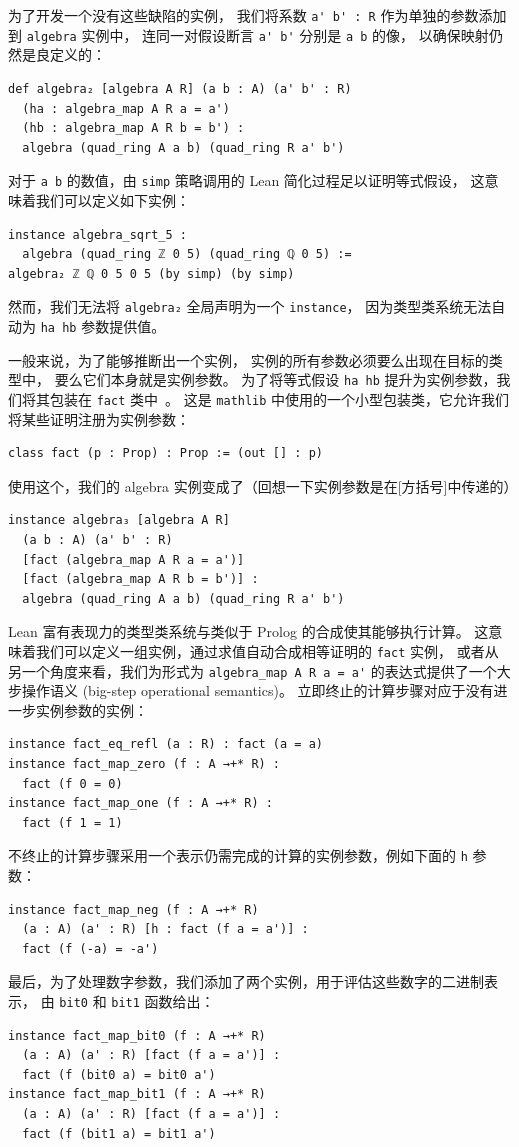 \documentclass[sigplan,10pt,nonacm,
screen]{acmart} \settopmatter{printfolios=true,printccs=false,printacmref=false}
\newcommand{\mathlib}{\lstinline{mathlib}\xspace}
\begin{document}
    为了开发一个没有这些缺陷的实例，
    我们将系数 \lstinline{a' b' : R} 作为单独的参数添加到 \lstinline{algebra} 实例中，
    连同一对假设断言 \lstinline{a' b'} 分别是 \lstinline{a b} 的像，
    以确保映射仍然是良定义的：
\begin{lstlisting}
def algebra₂ [algebra A R] (a b : A) (a' b' : R)
  (ha : algebra_map A R a = a')
  (hb : algebra_map A R b = b') :
  algebra (quad_ring A a b) (quad_ring R a' b')
\end{lstlisting}
    对于 \lstinline{a b} 的数值，由 \lstinline{simp} 策略调用的 Lean 简化过程足以证明等式假设，
    这意味着我们可以定义如下实例：
\begin{lstlisting}
instance algebra_sqrt_5 :
  algebra (quad_ring ℤ 0 5) (quad_ring ℚ 0 5) :=
algebra₂ ℤ ℚ 0 5 0 5 (by simp) (by simp)
\end{lstlisting}
    然而，我们无法将 \lstinline{algebra₂} 全局声明为一个 \lstinline{instance}，
    因为类型类系统无法自动为 \lstinline{ha hb} 参数提供值。

    一般来说，为了能够推断出一个实例，
    实例的所有参数必须要么出现在目标的类型中，
    要么它们本身就是实例参数。
    为了将等式假设 \lstinline{ha hb} 提升为实例参数，我们将其包装在 \lstinline{fact} 类中~\cite{typeclasses}。
    这是 \mathlib 中使用的一个小型包装类，它允许我们将某些证明注册为实例参数：
\begin{lstlisting}
class fact (p : Prop) : Prop := (out [] : p)
\end{lstlisting}
使用这个，我们的 algebra 实例变成了（回想一下实例参数是在[方括号]中传递的）
\begin{lstlisting}
instance algebra₃ [algebra A R]
  (a b : A) (a' b' : R)
  [fact (algebra_map A R a = a')]
  [fact (algebra_map A R b = b')] :
  algebra (quad_ring A a b) (quad_ring R a' b')
\end{lstlisting}
    Lean 富有表现力的类型类系统与类似于 Prolog 的合成使其能够执行计算。
    这意味着我们可以定义一组实例，通过求值自动合成相等证明的 \lstinline{fact} 实例，
    或者从另一个角度来看，我们为形式为 \lstinline{algebra_map A R a = a'} 的表达式提供了一个大步操作语义 (big-step operational semantics)。
    立即终止的计算步骤对应于没有进一步实例参数的实例：
\begin{lstlisting}
instance fact_eq_refl (a : R) : fact (a = a)
instance fact_map_zero (f : A →+* R) :
  fact (f 0 = 0)
instance fact_map_one (f : A →+* R) :
  fact (f 1 = 1)
\end{lstlisting}
	不终止的计算步骤采用一个表示仍需完成的计算的实例参数，例如下面的 \lstinline{h} 参数：
\begin{lstlisting}
instance fact_map_neg (f : A →+* R)
  (a : A) (a' : R) [h : fact (f a = a')] :
  fact (f (-a) = -a')
\end{lstlisting}
    最后，为了处理数字参数，我们添加了两个实例，用于评估这些数字的二进制表示，
    由 \lstinline{bit0} 和 \lstinline{bit1} 函数给出：
\begin{lstlisting}
instance fact_map_bit0 (f : A →+* R)
  (a : A) (a' : R) [fact (f a = a')] :
  fact (f (bit0 a) = bit0 a')
instance fact_map_bit1 (f : A →+* R)
  (a : A) (a' : R) [fact (f a = a')] :
  fact (f (bit1 a) = bit1 a')
\end{lstlisting}
\end{document}
